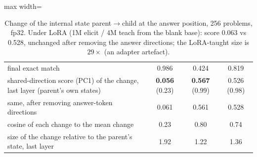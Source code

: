 \documentclass[11pt]{article}
\begin{document}
\begin{enumerate}[label=\textbf{M\arabic*}, leftmargin=*, itemsep=1.2em, resume]
\begin{table}[h]
\begin{adjustbox}{max width=\textwidth}
\begin{tabular}{lccc}
\midrule
final exact match & 0.986 & 0.424 & 0.819 \\
shared-direction score (PC1) of the change, last layer (parent's own states) & \textbf{0.056} (0.23) & \textbf{0.567} (0.99) & 0.526 (0.98) \\
same, after removing answer-token directions & 0.061 & 0.561 & 0.528 \\
cosine of each change to the mean change & 0.23 & 0.80 & 0.74 \\
size of the change relative to the parent's state, last layer & 1.92 & 1.22 & 1.36 \\
\bottomrule
\end{tabular}
\end{adjustbox}
\caption{Change of the internal state parent$\to$child at the answer position, 256 problems,
fp32. Under LoRA (1M elicit / 4M teach from the blank base): score 0.063 vs 0.528, unchanged
after removing the answer directions; the LoRA-taught size is $29\times$ (an adapter artefact).}
\label{tab:resid}
\end{table}



\end{enumerate}
\end{document}
